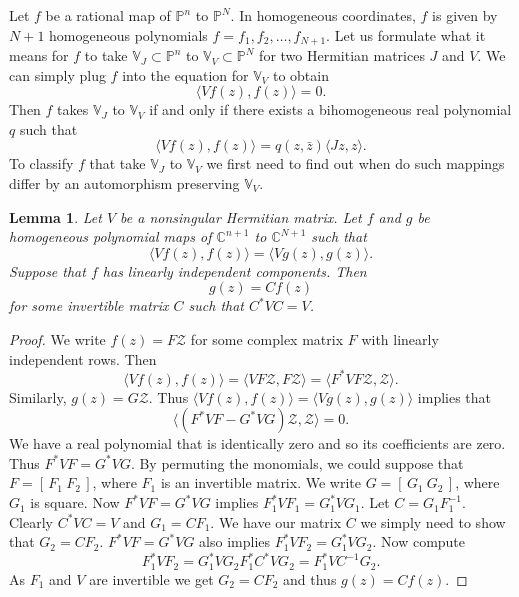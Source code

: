 \documentclass[12pt,openany]{book}
\newcommand{\C}{{\mathbb{C}}}
\newcommand{\bP}{{\mathbb{P}}}
\newcommand{\bV}{{\mathbb{V}}}
\newcommand{\sZ}{{\mathcal{Z}}}
\theoremstyle{plain}
\newtheorem{lemma}[thm]{Lemma}
\theoremstyle{remark}
\theoremstyle{definition}
\theoremstyle{exercise}
\theoremstyle{example}
\begin{document}
Let $f$ be
a rational map of $\bP^{n}$ to $\bP^{N}$.  In
homogeneous coordinates, $f$ is given by
$N+1$ homogeneous polynomials $f = f_1,f_2,\ldots,f_{N+1}$.
Let us
formulate what it means for $f$ to take
$\bV_J \subset \bP^{n}$ to $\bV_V \subset \bP^{N}$ for 
two Hermitian matrices $J$ and $V$.
We can simply plug $f$ into the equation for $\bV_V$ to obtain
\begin{equation}
\langle V f(z) , f(z) \rangle = 0 .
\end{equation}
Then $f$ takes
$\bV_J$ to $\bV_V$ if and only if there exists a bihomogeneous real
polynomial $q$ such that
\begin{equation}
\langle V f(z) , f(z) \rangle = q(z,\bar{z}) \langle J z , z \rangle .
\end{equation}
To classify $f$ that take $\bV_J$ to $\bV_V$
we first need to find out when do such mappings differ by an automorphism
preserving $\bV_V$.

\begin{lemma} \label{formprop}
Let $V$ be a nonsingular Hermitian matrix.  Let $f$ and $g$ be homogeneous
polynomial maps of $\C^{n+1}$ to $\C^{N+1}$ such that
\begin{equation}
\langle V f(z) , f(z) \rangle = \langle V g(z) , g(z) \rangle .
\end{equation}
Suppose that $f$ has linearly independent components.
Then
\begin{equation}
g(z) = C f(z)
\end{equation}
for some invertible matrix $C$ such that $C^* V C = V$.
\end{lemma}

\begin{proof}
We write
$f(z) = F \sZ$ for some complex matrix $F$ with linearly independent rows.
Then
\begin{equation}
\langle V f(z) , f(z) \rangle
=
\langle V F \sZ , F \sZ \rangle
=
\langle F^* V F \sZ , \sZ \rangle .
\end{equation}
Similarly, $g(z) = G \sZ$.
Thus
$\langle V f(z) , f(z) \rangle = \langle V g(z) , g(z) \rangle$ implies
that 
\begin{equation}
\langle ( F^* V F - G^* V G) \sZ, \sZ \rangle = 0.
\end{equation}
We have a real polynomial that is identically zero and so its coefficients
are zero.  Thus $F^* V F = G^* V G$.  By
permuting the monomials, we could suppose that
$F = [ \, F_1 ~ F_2 \, ]$, where $F_1$ is an invertible matrix.  We write
$G = [ \, G_1 ~ G_2 \, ]$, where $G_1$ is square.
Now $F^* V F = G^* V G$ implies
$F_1^* V F_1 = G_1^* V G_1$.  Let $C = G_1
F_1^{-1}$.  Clearly $C^* V C = V$ and $G_1 = C F_1$.  We have our matrix $C$
we simply need to show that $G_2 = C F_2$.
$F^* V F = G^* V G$ also implies
$F_1^* V F_2 = G_1^* V G_2$.  Now compute
\begin{equation*}
F_1^* V F_2 = G_1^* V G_2
F_1^* C^* V G_2
=
F_1^* V C^{-1} G_2.
\end{equation*}
As $F_1$ and $V$ are invertible
we get $G_2 = C F_2$ and thus $g(z) = C f(z)$.
\end{proof}
\end{document}
